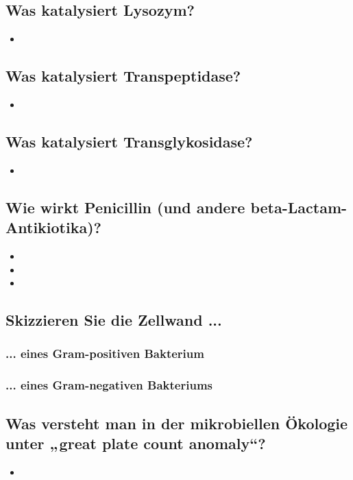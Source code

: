 \documentclass{article}
\begin{document}
\subsection*{Was katalysiert Lysozym?}
\begin{itemize}     \item  \end{itemize}
\subsection*{Was katalysiert Transpeptidase?}
\begin{itemize}     \item  \end{itemize}
\subsection*{Was katalysiert Transglykosidase?} 
\begin{itemize}     \item  \end{itemize}
\subsection*{Wie wirkt Penicillin (und andere beta-Lactam-Antikiotika)?}
\begin{itemize}
    \item 
    \item 
    \item 
\end{itemize}
\subsection*{Skizzieren Sie die Zellwand ...}
\subsubsection*{... eines Gram-positiven Bakterium}
\bigskip\bigskip\bigskip\bigskip\bigskip
\subsubsection*{... eines Gram-negativen Bakteriums}
\bigskip\bigskip\bigskip\bigskip\bigskip

\subsection*{Was versteht man
in der mikrobiellen Ökologie unter „great plate
count anomaly“?}
\begin{itemize}     \item  \end{itemize}
\end{document}
